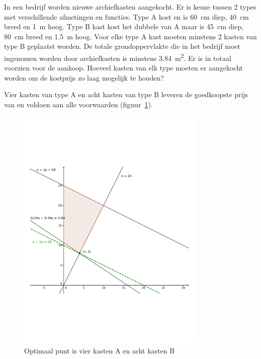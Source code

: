 \begin{oef}
In een bedrijf worden nieuwe archiefkasten aangekocht. Er
is keuze tussen 2 types met verschillende afmetingen en
functies. Type A kost  en is \SI{60}{\cm} diep, \SI{40}{\cm} breed en
\SI{1}{\m} hoog. Type B kast kost het dubbele van A maar is \SI{45}{\cm}
diep, \SI{80}{\centi\meter} breed en \SI{1,5}{\meter} hoog. Voor elke type A kast moeten
minstens 2 kasten van type B geplaatst worden. De totale
grondoppervlakte die in het bedrijf moet ingenomen worden door
archiefkasten is minstens \SI{3,84}{\square\meter}. Er is in totaal 
voorzien voor de aankoop. Hoeveel kasten van elk type moeten
er aangekocht worden om de kostprijs zo laag mogelijk te houden? 
\begin{opl}
Vier kasten van type A en acht kasten van type  B leveren de goedkoopste prijs van  en voldoen aan alle voorwaarden (figuur~\ref{fig:kastenAB}).
\begin{figure}[hbtp]
  \centering
  \includegraphics[width=0.8\textwidth]{oefeningen/FigurenLP/OefkastenAB.pdf}
  \caption{Optimaal punt is vier kasten A en acht kasten B}
  \label{fig:kastenAB}
\end{figure}
\end{opl}
\end{oef}
     
